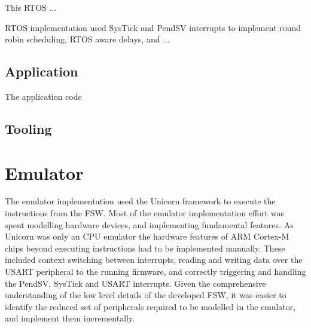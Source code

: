\documentclass[../report.tex]{subfiles}
\begin{document}
This RTOS ... %

RTOS implementation used SysTick and PendSV interrupts to implement round robin scheduling, RTOS aware delays, and ...

\subsection{Application}

The application code

\subsection{Tooling}








\section{Emulator}


The emulator implementation used the Unicorn framework to execute the
instructions from the FSW. Most of the emulator implementation effort was spent
modelling hardware devices, and implementing fundamental features. As Unicorn
was only an CPU emulator \citep{Unicorn} the hardware features of ARM Cortex-M
chips beyond executing instructions had to be implemented manually. These
included context switching between interrupts, reading and writing data over
the USART peripheral to the running firmware, and correctly triggering and
handling the PendSV, SysTick and USART interrupts. Given the comprehensive
understanding of the low level details of the developed FSW, it was easier to
identify the reduced set of peripherals required to be modelled in the
emulator, and implement them incrementally.
\end{document}
